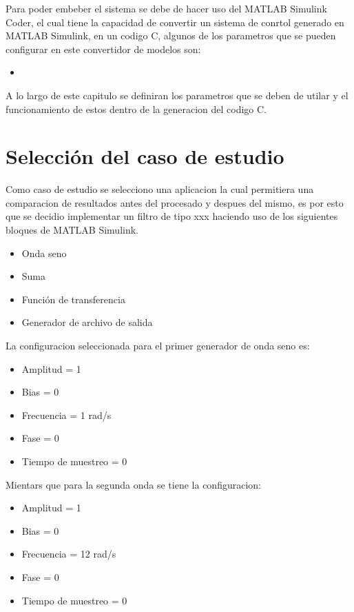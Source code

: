 Para poder embeber el sistema se debe de hacer uso del MATLAB Simulink Coder, el cual tiene la capacidad de convertir un sistema de conrtol generado en MATLAB Simulink, en un codigo C, algunos de los parametros que se pueden configurar en este convertidor de modelos son:

\begin{itemize}
    \item 
\end{itemize}

A lo largo de este capitulo se definiran los parametros que se deben de utilar y el funcionamiento de estos dentro de la generacion del codigo C.

\section{Selección del caso de estudio}

Como caso de estudio se selecciono una aplicacion la cual permitiera una comparacion de resultados antes del procesado y despues del mismo, es por esto que se decidio implementar un filtro  de tipo xxx haciendo uso de los siguientes bloques de MATLAB Simulink. 

\begin{itemize}
    \item Onda seno
    \item Suma
    \item Función de transferencia
    \item Generador de archivo de salida
\end{itemize}

La configuracion seleccionada para el primer generador de onda seno es:

\begin{itemize}
    \item Amplitud = 1
    \item Bias = 0 
    \item Frecuencia = 1 rad/s
    \item Fase = 0 
    \item Tiempo de muestreo = 0 
\end{itemize}

Mientars que para la segunda onda se tiene la configuracion:

\begin{itemize}
    \item Amplitud = 1
    \item Bias = 0 
    \item Frecuencia = 12 rad/s
    \item Fase = 0 
    \item Tiempo de muestreo = 0 
\end{itemize}

